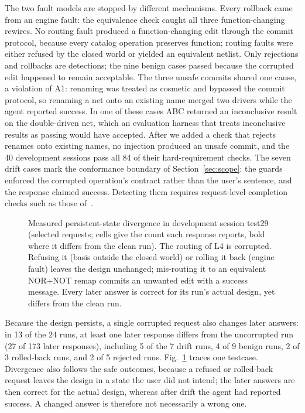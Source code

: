 \documentclass[conference,letterpaper]{IEEEtran}
\begin{document}
The two fault models are stopped by different mechanisms. Every rollback came
from an engine fault: the equivalence check caught all three function-changing
rewires. No routing fault produced a function-changing edit through the commit
protocol, because every catalog operation preserves function; routing faults
were either refused by the closed world or yielded an equivalent netlist. Only
rejections and rollbacks are detections; the nine benign cases passed
because the corrupted edit happened to remain acceptable. The three unsafe
commits shared one cause, a violation of A1: renaming was treated as cosmetic
and bypassed the commit protocol, so renaming a net onto an existing name
merged two drivers while the agent reported success. In one of these cases ABC
returned an inconclusive result on the double-driven net, which an evaluation
harness that treats inconclusive results as passing would have accepted.
After we added a check that rejects renames onto existing names, no injection
produced an unsafe commit, and the 40 development sessions pass all 84 of their
hard-requirement checks. The seven drift cases mark the conformance boundary
of Section~\ref{sec:scope}: the guards enforced the corrupted operation's
contract rather than the user's sentence, and the response claimed success.
Detecting them requires request-level completion checks such as those
of~\cite{companion}.

\begin{figure}[t]
\centering

\caption{Measured persistent-state divergence in development session test29
(selected requests; cells give the count each response reports, bold where it
differs from the clean run). The routing of L4 is corrupted. Refusing it
(basis outside the closed world) or rolling it back (engine fault) leaves the
design unchanged; mis-routing it to an equivalent NOR+NOT remap commits an
unwanted edit with a success message. Every later answer is correct for its
run's actual design, yet differs from the clean run.}
\label{fig:case}
\end{figure}

Because the design persists, a single corrupted request also changes later
answers: in 13 of the 24 runs, at least one later response differs from the
uncorrupted run (27 of 173 later responses), including 5 of the 7 drift runs,
4 of 9 benign runs, 2 of 3 rolled-back runs, and 2 of 5 rejected runs.
Fig.~\ref{fig:case} traces one testcase. Divergence also follows the safe
outcomes, because a refused or rolled-back request leaves the design in a state
the user did not intend; the later answers are then correct for the actual
design, whereas after drift the agent had reported success. A changed answer
is therefore not necessarily a wrong one.
\end{document}
